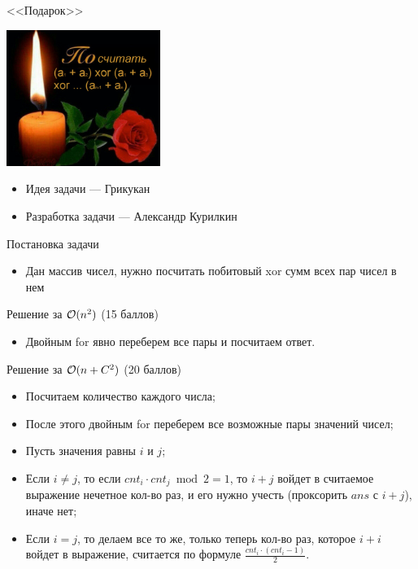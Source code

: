 \begin{frame}
  \begin{center}
    \LARGE <<Подарок>>
  \end{center}
  
  \begin{center}
      \includegraphics[width=5cm]{e-meme.png}
  \end{center}

  \begin{itemize}
  \item Идея задачи --- Грикукан
  \item Разработка задачи --- Александр Курилкин
  \end{itemize}

\end{frame}

\begin{frame}{Постановка задачи}

  \begin{itemize}
  \item Дан массив чисел, нужно посчитать побитовый xor сумм всех пар чисел в нем
  \end{itemize}

\end{frame}

\begin{frame}{Решение за $\mathcal{O}(n^2)$ (15 баллов)}
  \begin{itemize}
  \item Двойным for явно переберем все пары и посчитаем ответ.
  \end{itemize}
\end{frame}

\begin{frame}{Решение за $\mathcal{O}(n + C^2)$ (20 баллов)}
  \begin{itemize}
  \item Посчитаем количество каждого числа;
  \item После этого двойным for переберем все возможные пары значений чисел;
  \item Пусть значения равны $i$ и $j$;
  \item Если $i \neq j$, то если $cnt_i \cdot cnt_j \bmod 2 = 1$, то $i + j$ войдет в считаемое выражение нечетное кол-во раз, и его нужно учесть (проксорить $ans$ с $i + j$), иначе нет;
  \item Если $i = j$, то делаем все то же, только теперь кол-во раз, которое $i + i$ войдет в выражение, считается по формуле $\frac{cnt_i \cdot (cnt_{i} - 1)}{2}$.
  \end{itemize}
\end{frame}


